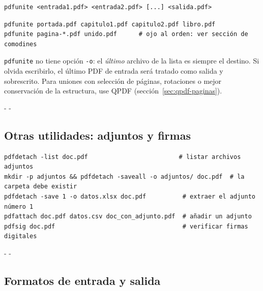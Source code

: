 \documentclass[11pt,a4paper]{article}
\makeatletter
\newcommand{\necesitaespacio}[1]{\par\penalty-100\begingroup
	\setlength{\dimen@}{#1}\dimen@ii\pagegoal\advance\dimen@ii-\pagetotal
	\ifdim\dimen@>\dimen@ii\ifdim\dimen@ii>\z@\vfil\fi\penalty-\@M\fi\endgroup}
\newcommand{\cmd}[1]{\texttt{\textcolor{colcmd}{#1}}}      %
\newcommand{\opt}[1]{\texttt{\textcolor{colopt}{#1}}}      %
\makeatother
\begin{document}
	\begin{lstlisting}[style=sintaxis]
pdfunite <entrada1.pdf> <entrada2.pdf> [...] <salida.pdf>
\end{lstlisting}
	
	\begin{lstlisting}
pdfunite portada.pdf capitulo1.pdf capitulo2.pdf libro.pdf
pdfunite pagina-*.pdf unido.pdf      # ojo al orden: ver sección de comodines
\end{lstlisting}
	
	\begin{importante}
		\cmd{pdfunite} no tiene opción \opt{-o}: el \emph{último} archivo de la lista es siempre el destino. Si olvida escribirlo, el último PDF de entrada será tratado como salida y sobrescrito. Para uniones con selección de páginas, rotaciones o mejor conservación de la estructura, use QPDF (sección~\ref{sec:qpdf-paginas}).
	\end{importante}
	
	\necesitaespacio{8\baselineskip}
	\subsection{Otras utilidades: adjuntos y firmas}\label{sec:pdf-otras}
	
	\begin{lstlisting}
pdfdetach -list doc.pdf                         # listar archivos adjuntos
mkdir -p adjuntos && pdfdetach -saveall -o adjuntos/ doc.pdf  # la carpeta debe existir
pdfdetach -save 1 -o datos.xlsx doc.pdf          # extraer el adjunto número 1
pdfattach doc.pdf datos.csv doc_con_adjunto.pdf  # añadir un adjunto
pdfsig doc.pdf                                   # verificar firmas digitales
\end{lstlisting}
	
	\necesitaespacio{29\baselineskip}
	\subsection{Formatos de entrada y salida}
	
\end{document}
